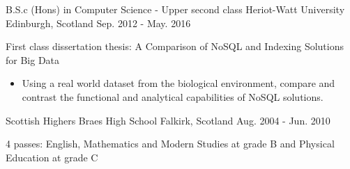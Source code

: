 \begin{cventries}
  \cventry
    {B.S.c (Hons) in Computer Science - Upper second class}
    {Heriot-Watt University}
    {Edinburgh, Scotland}
    {Sep. 2012 - May. 2016}
    {
      \begin{cvitems}
        \item {First class dissertation thesis: A Comparison of NoSQL and Indexing Solutions for Big Data}
        \vspace{1mm}
          \begin{itemize}
            \item Using a real world dataset from the biological environment, compare and contrast the functional and analytical capabilities of NoSQL solutions.
          \end{itemize}
      \end{cvitems}
    }
    \cventry
    {Scottish Highers}
    {Braes High School}
    {Falkirk, Scotland}
    {Aug. 2004 - Jun. 2010}
    {
      \begin{cvitems}
        \item {4 passes: English, Mathematics and Modern Studies at grade B and Physical Education at grade C}
      \end{cvitems}
    }
\end{cventries}